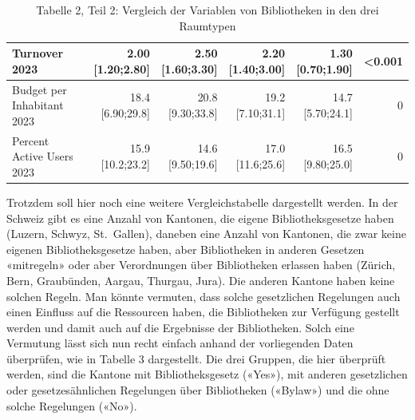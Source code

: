 \documentclass[a4paper,
fontsize=11pt,
oneside,
numbers=noperiodatend,
parskip=half-,
bibliography=totoc,
final
]{scrartcl}
\begin{document}
\begin{landscape}
\begin{table}[]
\begin{tabular}{lrrrrr}
Turnover 2023                    & \makecell{ 2.00 \\ {[}1.20;2.80{]}}     & \makecell{ 2.50 \\ {[}1.60;3.30{]}}      & \makecell{ 2.20 \\ {[}1.40;3.00{]}}     & \makecell{ 1.30 \\ {[}0.70;1.90{]}}   & \textless{}0.001   \\ \hline
Budget per Inhabitant 2023       & \makecell{ 18.4 \\ {[}6.90;29.8{]}}     & \makecell{ 20.8 \\ {[}9.30;33.8{]}}      & \makecell{ 19.2 \\ {[}7.10;31.1{]}}     & \makecell{ 14.7 \\ {[}5.70;24.1{]}}   & 0                  \\ \hline
Percent Active Users 2023        & \makecell{ 15.9 \\ {[}10.2;23.2{]}}     & \makecell{ 14.6 \\ {[}9.50;19.6{]}}      & \makecell{ 17.0 \\ {[}11.6;25.6{]}}     & \makecell{ 16.5 \\ {[}9.80;25.0{]}}   & 0                  \\ \hline
\end{tabular}
\caption{Tabelle 2, Teil 2: Vergleich der Variablen von Bibliotheken in den drei Raumtypen}
\end{table}
\end{landscape}

Trotzdem soll hier noch eine weitere Vergleichstabelle dargestellt
werden. In der Schweiz gibt es eine Anzahl von Kantonen, die eigene
Bibliotheksgesetze haben (Luzern, Schwyz, St.~Gallen), daneben eine
Anzahl von Kantonen, die zwar keine eigenen Bibliotheksgesetze haben,
aber Bibliotheken in anderen Gesetzen «mitregeln» oder aber Verordnungen
über Bibliotheken erlassen haben (Zürich, Bern, Graubünden, Aargau,
Thurgau, Jura). Die anderen Kantone haben keine solchen Regeln. Man
könnte vermuten, dass solche gesetzlichen Regelungen auch einen Einfluss
auf die Ressourcen haben, die Bibliotheken zur Verfügung gestellt werden
und damit auch auf die Ergebnisse der Bibliotheken. Solch eine Vermutung
lässt sich nun recht einfach anhand der vorliegenden Daten überprüfen,
wie in Tabelle 3 dargestellt. Die drei Gruppen, die hier überprüft
werden, sind die Kantone mit Bibliotheksgesetz («Yes»), mit anderen
gesetzlichen oder gesetzesähnlichen Regelungen über Bibliotheken
(«Bylaw») und die ohne solche Regelungen («No»).
\end{document}
